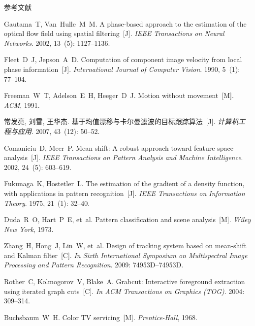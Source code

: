 \documentclass[xcolor=svgnames,serif,table,10pt]{beamer}
\begin{document}
\begin{frame}[allowframebreaks]{参考文献}
\begin{thebibliography}{10}
Gautama~T, Van~Hulle~M~M.
\newblock A phase-based approach to the estimation of the optical flow field using
  spatial filtering~[J].
\newblock \emph{IEEE Transactions on Neural Networks}.
2002, 13~(5):  1127--1136.

Fleet~D~J, Jepson~A~D.
\newblock Computation of component image velocity from local phase information~[J].
\newblock \emph{International Journal of Computer Vision}.
1990, 5~(1):  77--104.

{\beamertemplatebookbibitems
{}
Freeman~W~T, Adelson~E~H, Heeger~D~J.
\newblock Motion without movement~[M].
\newblock \emph{ACM}, 1991.}

常发亮, 刘雪, 王华杰.
\newblock 基于均值漂移与卡尔曼滤波的目标跟踪算法~[J].
\newblock \emph{计算机工程与应用}.
2007, 43~(12):  50--52.

Comaniciu~D, Meer~P.
\newblock Mean shift: A robust approach toward feature space analysis~[J].
\newblock \emph{IEEE Transactions on Pattern Analysis and Machine Intelligence}.
2002, 24~(5):  603--619.

Fukunaga~K, Hostetler~L.
\newblock The estimation of the gradient of a density function, with applications in
  pattern recognition~[J].
\newblock \emph{IEEE Transactions on Information Theory}.
1975, 21~(1):  32--40.

{\beamertemplatebookbibitems
{}
Duda~R~O, Hart~P~E, et~al.
\newblock Pattern classification and scene analysis~[M].
\newblock \emph{Wiley New York}, 1973.}

Zhang~H, Hong~J, Lin~W, et~al.
\newblock Design of tracking system based on mean-shift and Kalman filter~[C].
\newblock \emph{In Sixth International Symposium on Multispectral Image Processing and Pattern Recognition}.
2009:  74953D--74953D.

Rother~C, Kolmogorov~V, Blake~A.
\newblock Grabcut: Interactive foreground extraction using iterated graph cuts~[C].
\newblock \emph{In ACM Transactions on Graphics (TOG)}.
2004:  309--314.

{\beamertemplatebookbibitems
{}
Buchsbaum~W~H.
\newblock Color TV servicing~[M].
\newblock \emph{Prentice-Hall}, 1968.}


\end{thebibliography}
\end{frame}
\end{document}
